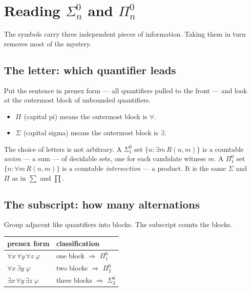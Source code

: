 \documentclass[11pt,a4paper]{article}
\newcommand{\Sig}[2]{\Sigma^{#1}_{#2}}
\newcommand{\Pai}[2]{\Pi^{#1}_{#2}}
\begin{document}
\section{Reading $\Sig{0}{n}$ and $\Pai{0}{n}$}\label{sec:notation}

The symbols carry three independent pieces of information. Taking them in
turn removes most of the mystery.

\subsection*{The letter: which quantifier leads}

Put the sentence in prenex form --- all quantifiers pulled to the front --- and
look at the outermost block of unbounded quantifiers.

\begin{itemize}
\item $\Pai{}{}$ (capital pi) means the outermost block is $\forall$.
\item $\Sig{}{}$ (capital sigma) means the outermost block is $\exists$.
\end{itemize}

The choice of letters is not arbitrary. A $\Sig{0}{1}$ set
$\{n : \exists m\, R(n,m)\}$ is a countable \emph{union} --- a sum --- of
decidable sets, one for each candidate witness $m$. A $\Pai{0}{1}$ set
$\{n : \forall m\, R(n,m)\}$ is a countable \emph{intersection} --- a product.
It is the same $\Sigma$ and $\Pi$ as in $\sum$ and $\prod$.

\subsection*{The subscript: how many alternations}

Group adjacent like quantifiers into blocks. The subscript counts the blocks.

\begin{center}
\begin{tabular}{@{}ll@{}}
\toprule
prenex form & classification \\
\midrule
$\forall x\, \forall y\, \forall z\; \varphi$ & one block $\Rightarrow$ $\Pai{0}{1}$ \\
$\forall x\, \exists y\; \varphi$ & two blocks $\Rightarrow$ $\Pai{0}{2}$ \\
$\exists x\, \forall y\, \exists z\; \varphi$ & three blocks $\Rightarrow$ $\Sig{0}{3}$ \\
\bottomrule
\end{tabular}
\end{center}
\end{document}
